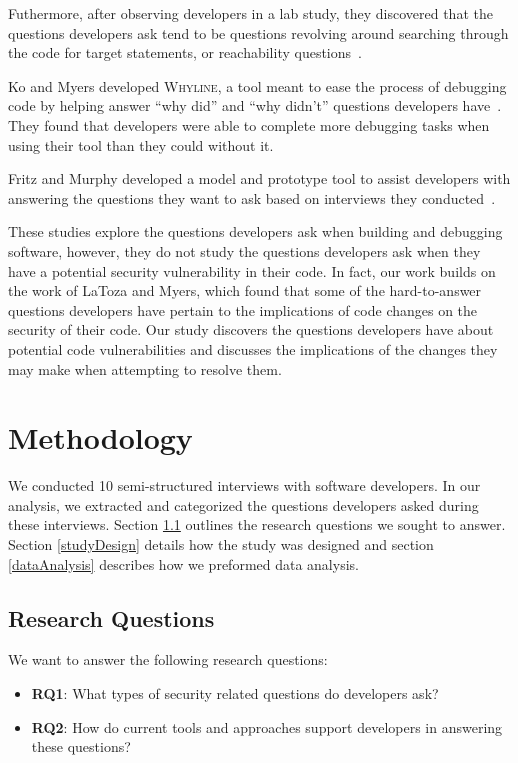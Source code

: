 \documentclass[conference]{IEEEtran}
\begin{document}
Futhermore, after observing developers in a lab study, they discovered that the questions developers ask tend to be questions revolving around searching through the code for target statements, or reachability questions~\cite{latoza2010developers}. 

Ko and Myers developed \textsc{Whyline}, a tool meant to ease the process of debugging code by helping answer ``why did'' and ``why didn't'' questions developers have~\cite{ko2004designing}. They found that developers were able to complete more debugging tasks when using their tool than they could without it.

Fritz and Murphy developed a model and prototype tool to assist developers with answering the questions they want to ask based on interviews they conducted~\cite{fritz2010using}.


These studies explore the questions developers ask when building and debugging software, however, they do not study the questions developers ask when they have a potential security vulnerability in their code. 
In fact, our work builds on the work of LaToza and Myers, which found that some of the hard-to-answer questions developers have pertain to the implications of code changes on the security of their code. 
Our study discovers the questions developers have about potential code vulnerabilities and discusses the implications of the changes they may make when attempting to resolve them. 

\section{Methodology}
\label{sec:meth}
We conducted 10 semi-structured interviews with software developers. In our analysis, we extracted and categorized the questions developers asked during these interviews. 
Section \ref{rqs} outlines the research questions we sought to answer. 
Section \ref{studyDesign} details how the study was designed and section \ref{dataAnalysis} describes how we preformed data analysis.


\subsection{Research Questions}
\label{rqs}
We want to answer the following research questions:
\begin{itemize}
\item \textbf{RQ1}: What types of security related questions do developers ask?
\item \textbf{RQ2}: How do current tools and approaches support developers in answering these questions?
\end{itemize}
\end{document}
